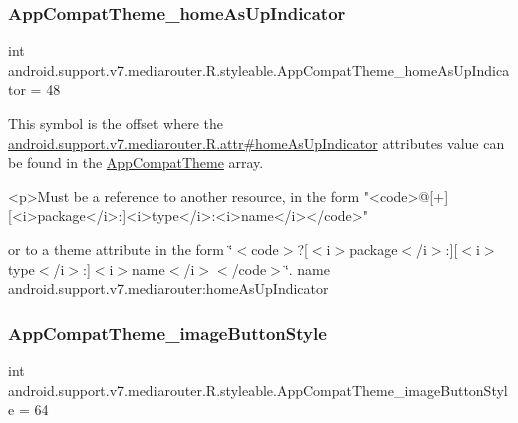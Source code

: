 \subsubsection{\texorpdfstring{App\+Compat\+Theme\+\_\+home\+As\+Up\+Indicator}{AppCompatTheme\_homeAsUpIndicator}}
{\footnotesize\ttfamily int android.\+support.\+v7.\+mediarouter.\+R.\+styleable.\+App\+Compat\+Theme\+\_\+home\+As\+Up\+Indicator = 48\hspace{0.3cm}{\ttfamily [static]}}

This symbol is the offset where the \hyperlink{classandroid_1_1support_1_1v7_1_1mediarouter_1_1R_1_1attr_aef82f0702653b8305457086c422d866c}{android.\+support.\+v7.\+mediarouter.\+R.\+attr\#home\+As\+Up\+Indicator} attribute\textquotesingle{}s value can be found in the \hyperlink{classandroid_1_1support_1_1v7_1_1mediarouter_1_1R_1_1styleable_a4e3d3900c75d49aeb2f283cac00214d6}{App\+Compat\+Theme} array.

\begin{DoxyVerb}      <p>Must be a reference to another resource, in the form "<code>@[+][<i>package</i>:]<i>type</i>:<i>name</i></code>"
\end{DoxyVerb}
 or to a theme attribute in the form \char`\"{}$<$code$>$?\mbox{[}$<$i$>$package$<$/i$>$\+:\mbox{]}\mbox{[}$<$i$>$type$<$/i$>$\+:\mbox{]}$<$i$>$name$<$/i$>$$<$/code$>$\char`\"{}.  name android.\+support.\+v7.\+mediarouter\+:home\+As\+Up\+Indicator \mbox{\label{classandroid_1_1support_1_1v7_1_1mediarouter_1_1R_1_1styleable_a9168d9e2a7a62b5b606d8a6429c93118}} 
\subsubsection{\texorpdfstring{App\+Compat\+Theme\+\_\+image\+Button\+Style}{AppCompatTheme\_imageButtonStyle}}
{\footnotesize\ttfamily int android.\+support.\+v7.\+mediarouter.\+R.\+styleable.\+App\+Compat\+Theme\+\_\+image\+Button\+Style = 64\hspace{0.3cm}{\ttfamily [static]}}

